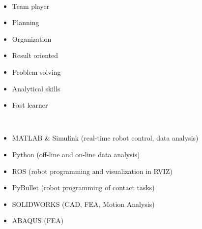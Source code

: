\documentclass[lighthipster]{simplehipstercv}
\begin{document}
\begin{paracol}{2}
{%
			
			\bigskip
			\bigskip
			
					
			\bigskip
			\bigskip
			
			 \\[0.5em]
			\begin{itemize}[leftmargin=1em, itemsep=0pt, topsep=0pt]
				\item Team player
				\item Planning
				\item Organization
				\item Result oriented
				\item Problem solving
				\item Analytical skills
				\item Fast learner
			\end{itemize}
			
			\bigskip	
			\bigskip
			\bigskip
			\bigskip
			
			 \\[0.5em]
			
			\begin{itemize}[leftmargin=1em, itemsep=0pt, topsep=0pt]
				\item MATLAB \& Simulink (real-time robot control, data analysis)
				\item Python (off-line and on-line data analysis)
				\item ROS (robot programming and visualization in RVIZ)
				\item PyBullet (robot programming of contact tasks)
				\item SOLIDWORKS (CAD, FEA, Motion Analysis)
				\item ABAQUS (FEA)
			\end{itemize}
				
}
\end{paracol}
\end{document}
